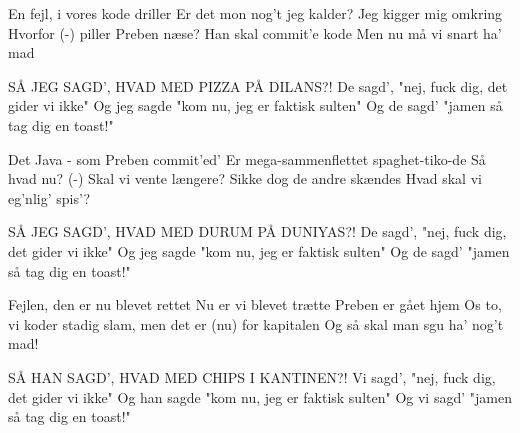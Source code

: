 \documentclass[a4paper,11pt]{article}
\begin{document}
\begin{song}

 En fejl, i vores kode driller
Er det mon nog't jeg kalder?
Jeg kigger mig omkring
Hvorfor (-) piller Preben næse?
Han skal commit'e kode
Men nu må vi snart ha' mad


 SÅ JEG SAGD', HVAD MED PIZZA PÅ DILANS?!
De sagd',
 "nej, fuck dig, det gider vi ikke"
 Og jeg sagde "kom nu, jeg er faktisk sulten"
Og de sagd'
 "jamen så tag dig en toast!"




 Det Java - som Preben commit'ed'
Er mega-sammenflettet
spaghet-tiko-de
Så hvad nu?  (-) Skal vi vente længere?
Sikke dog de andre skændes
Hvad skal vi eg'nlig' spis'?


 SÅ JEG SAGD', HVAD MED DURUM PÅ DUNIYAS?!
De sagd',
 "nej, fuck dig, det gider vi ikke"
 Og jeg sagde "kom nu, jeg er faktisk sulten"
Og de sagd'
 "jamen så tag dig en toast!"



 Fejlen, den er nu blevet rettet
Nu er vi blevet trætte
Preben er gået hjem
Os to, vi koder stadig slam, men
det er (nu) for kapitalen
 Og så skal man sgu ha' nog't mad!


 SÅ HAN SAGD', HVAD MED CHIPS I KANTINEN?!
Vi sagd', "nej, fuck dig, det gider vi ikke"
Og han sagde "kom nu, jeg er faktisk sulten"
Og vi sagd' "jamen så tag dig en toast!"



\end{song}
\end{document}
